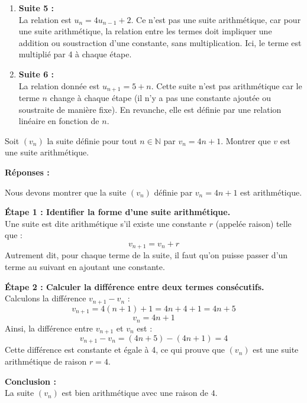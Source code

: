 \documentclass[a4paper,12pt]{article}
\begin{document}
\begin{enumerate}
        \item \textbf{Suite 5 :} \\
        La relation est $u_n = 4u_{n-1} + 2$. Ce n’est pas une suite arithmétique, car pour une suite arithmétique, la relation entre les termes doit impliquer une addition ou soustraction d'une constante, sans multiplication. Ici, le terme est multiplié par 4 à chaque étape.
    
        \item \textbf{Suite 6 :} \\
        La relation donnée est $u_{n+1} = 5 + n$. Cette suite n’est pas arithmétique car le terme $n$ change à chaque étape (il n'y a pas une constante ajoutée ou soustraite de manière fixe). En revanche, elle est définie par une relation linéaire en fonction de $n$.
    \end{enumerate}


    \begin{tcolorbox}[colback=gray!10, colframe=gray!50, title=Exercice \textbf{100}]
      Soit $(v_n)$ la suite définie pour tout $n \in \mathbb{N}$ par $v_n = 4n + 1$. Montrer que $v$ est une suite arithmétique.
      \end{tcolorbox}
      
      \bigskip
      
      \textbf{Réponses :}
      
      Nous devons montrer que la suite $(v_n)$ définie par $v_n = 4n + 1$ est arithmétique.
      
      \textbf{Étape 1 : Identifier la forme d'une suite arithmétique.} \\
      Une suite est dite arithmétique s'il existe une constante $r$ (appelée raison) telle que :
      \[
      v_{n+1} = v_n + r
      \]
      Autrement dit, pour chaque terme de la suite, il faut qu'on puisse passer d'un terme au suivant en ajoutant une constante.
      
      \textbf{Étape 2 : Calculer la différence entre deux termes consécutifs.} \\
      Calculons la différence $v_{n+1} - v_n$ :
      \[
      v_{n+1} = 4(n+1) + 1 = 4n + 4 + 1 = 4n + 5
      \]
      \[
      v_n = 4n + 1
      \]
      Ainsi, la différence entre $v_{n+1}$ et $v_n$ est :
      \[
      v_{n+1} - v_n = (4n + 5) - (4n + 1) = 4
      \]
      Cette différence est constante et égale à 4, ce qui prouve que $(v_n)$ est une suite arithmétique de raison $r = 4$.
      
      \textbf{Conclusion :} \\
      La suite $(v_n)$ est bien arithmétique avec une raison de $4$.
      
\end{document}
